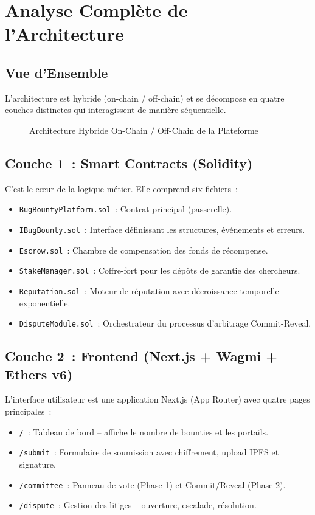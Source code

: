 \documentclass[12pt, a4paper]{report}
\begin{document}
\chapter{Analyse Compl\`{e}te de l'Architecture}

\section{Vue d'Ensemble}
L'architecture est hybride (on-chain / off-chain) et se d\'{e}compose en quatre couches distinctes qui interagissent de mani\`{e}re s\'{e}quentielle.

\begin{figure}[H]
    \centering
    \caption{Architecture Hybride On-Chain / Off-Chain de la Plateforme}
    \label{fig:architecture}
\end{figure}

\section{Couche 1~: Smart Contracts (Solidity)}
C'est le c\oe{}ur de la logique m\'{e}tier. Elle comprend six fichiers~:
\begin{itemize}
    \item \texttt{BugBountyPlatform.sol}~: Contrat principal (passerelle).
    \item \texttt{IBugBounty.sol}~: Interface d\'{e}finissant les structures, \'{e}v\'{e}nements et erreurs.
    \item \texttt{Escrow.sol}~: Chambre de compensation des fonds de r\'{e}compense.
    \item \texttt{StakeManager.sol}~: Coffre-fort pour les d\'{e}p\^{o}ts de garantie des chercheurs.
    \item \texttt{Reputation.sol}~: Moteur de r\'{e}putation avec d\'{e}croissance temporelle exponentielle.
    \item \texttt{DisputeModule.sol}~: Orchestrateur du processus d'arbitrage Commit-Reveal.
\end{itemize}

\section{Couche 2~: Frontend (Next.js + Wagmi + Ethers v6)}
L'interface utilisateur est une application Next.js (App Router) avec quatre pages principales~:
\begin{itemize}
    \item \texttt{/}~: Tableau de bord -- affiche le nombre de bounties et les portails.
    \item \texttt{/submit}~: Formulaire de soumission avec chiffrement, upload IPFS et signature.
    \item \texttt{/committee}~: Panneau de vote (Phase 1) et Commit/Reveal (Phase 2).
    \item \texttt{/dispute}~: Gestion des litiges -- ouverture, escalade, r\'{e}solution.
\end{itemize}
\end{document}

